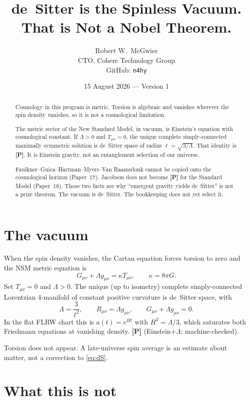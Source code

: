 \documentclass[11pt]{article}
\title{\textbf{de~Sitter is the Spinless Vacuum.\\
That is Not a Nobel Theorem.}}
\author{Robert W.\ McGwier\\
\small CTO, Cohere Technology Group\\
\small GitHub: \texttt{n4hy}}
\date{15 August 2026 --- Version 1}
\newcommand{\pP}{\textbf{[P]}}
\begin{document}
\maketitle

\begin{abstract}
\noindent
Cosmology in this program is metric. Torsion is algebraic and
vanishes wherever the spin density vanishes, so it is not a
cosmological limitation.

The metric sector of the New Standard Model, in vacuum, is
Einstein's equation with cosmological constant. If $\Lambda>0$
and $T_{\mu\nu}=0$, the unique complete simply-connected
maximally symmetric solution is de~Sitter space of radius
$\ell=\sqrt{3/\Lambda}$. That identity is \pP{}. It is Einstein
gravity, not an entanglement selection of our universe.

Faulkner--Guica--Hartman--Myers--Van Raamsdonk cannot be copied
onto the cosmological horizon (Paper~17). Jacobson does not
become \pP{} for the Standard Model (Paper~18). Those two facts
are why ``emergent gravity yields de~Sitter'' is not a prize
theorem. The vacuum is de~Sitter. The bookkeeping does not yet
select it.
\end{abstract}

\section{The vacuum}

When the spin density vanishes, the Cartan equation forces
torsion to zero and the NSM metric equation is
\begin{equation}
G_{\mu\nu}+\Lambda g_{\mu\nu}=\kappa T_{\mu\nu},
\qquad
\kappa=8\pi G.
\label{eq:EE}
\end{equation}
Set $T_{\mu\nu}=0$ and $\Lambda>0$. The unique (up to isometry)
complete simply-connected Lorentzian 4-manifold of constant
positive curvature is de~Sitter space, with
\begin{equation}
\Lambda=\frac{3}{\ell^2},
\qquad
R_{\mu\nu}=\Lambda g_{\mu\nu},
\qquad
G_{\mu\nu}+\Lambda g_{\mu\nu}=0.
\label{eq:dS}
\end{equation}
In the flat FLRW chart this is $a(t)=e^{Ht}$ with $H^2=\Lambda/3$,
which saturates both Friedmann equations at vanishing density.
\pP{} (Einstein$+\Lambda$; machine-checked).

Torsion does not appear. A late-universe spin average is an
estimate about matter, not a correction to \eqref{eq:dS}.

\section{What this is not}
\end{document}
